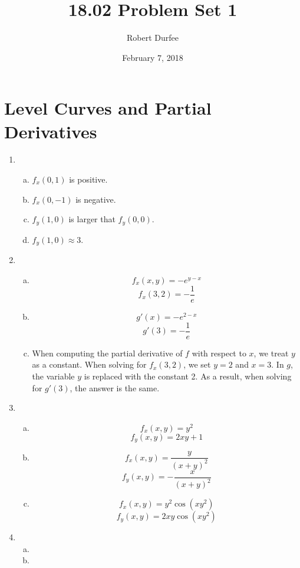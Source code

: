 \documentclass{article}
\title{ 18.02 Problem Set 1 }
\author{ Robert Durfee }
\date{ February 7, 2018 }
\begin{document}
\maketitle

\section{ Level Curves and Partial Derivatives }

\begin{enumerate}[1.]
  \item \begin{enumerate}[a.]
      \item $f_{x}(0, 1)$ is positive.
      \item $f_{x}(0, -1)$ is negative.
      \item $f_{y}(1, 0)$ is larger that $f_{y}(0, 0)$.
      \item $f_{y}(1, 0) \approx 3$.
    \end{enumerate}
  \item \begin{enumerate}[a.]
      \item $$ f_{x}(x, y) = -e^{y - x} $$
        $$ f_{x}(3, 2) = -\frac{ 1 }{ e } $$
      \item $$ g'(x) = -e^{2 - x} $$
        $$ g'(3) = -\frac{ 1 }{ e }$$
      \item When computing the partial derivative of $f$ with respect to $x$, we
        treat $y$ as a constant. When solving for $f_{x}(3, 2)$, we set $y = 2$
        and $x = 3$.  In $g$, the variable $y$ is replaced with the constant 2.
        As a result, when solving for $g'(3)$, the answer is the same.
    \end{enumerate}
  \item \begin{enumerate}[a.]
      \item $$ f_{x}(x, y) = y^{2} $$
        $$ f_{y}(x, y) = 2xy + 1 $$
      \item $$ f_{x}(x, y) = \frac{ y }{ (x + y)^{2} } $$
        $$ f_{y}(x, y) = -\frac{ x }{ (x + y)^{2} } $$
      \item $$ f_{x}(x, y) = y^{2} \cos(xy^{2}) $$
        $$ f_{y}(x, y) = 2xy \cos(xy^{2}) $$
    \end{enumerate}
  \item \begin{enumerate}[a.]
      \item
      \item
    \end{enumerate}

\end{enumerate}
\end{document}
